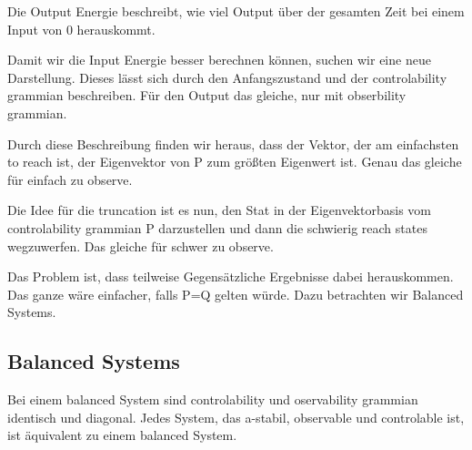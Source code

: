 \documentclass[]{article}
\begin{document}
Die Output Energie beschreibt, wie viel Output über der gesamten Zeit bei einem Input von 0 herauskommt.  
 
Damit wir die Input Energie besser berechnen können, suchen wir eine neue Darstellung. Dieses lässt sich durch den Anfangszustand und der controlability grammian beschreiben. Für den Output das gleiche, nur mit obserbility grammian. 

Durch diese Beschreibung finden wir heraus, dass der Vektor, der am einfachsten to reach ist, der Eigenvektor von P zum größten Eigenwert ist. Genau das gleiche für einfach zu observe. 

Die Idee für die truncation ist es nun, den Stat in der Eigenvektorbasis vom controlability grammian P darzustellen und dann die schwierig reach states wegzuwerfen. Das gleiche für schwer zu observe. 

Das Problem ist, dass teilweise Gegensätzliche Ergebnisse dabei herauskommen. Das ganze wäre einfacher, falls P=Q gelten würde. Dazu betrachten wir Balanced Systems.

\subsection{Balanced Systems}
Bei einem balanced System sind controlability und oservability grammian identisch und diagonal. Jedes System, das a-stabil, observable und controlable ist, ist äquivalent zu einem balanced System. 
 
\end{document}
